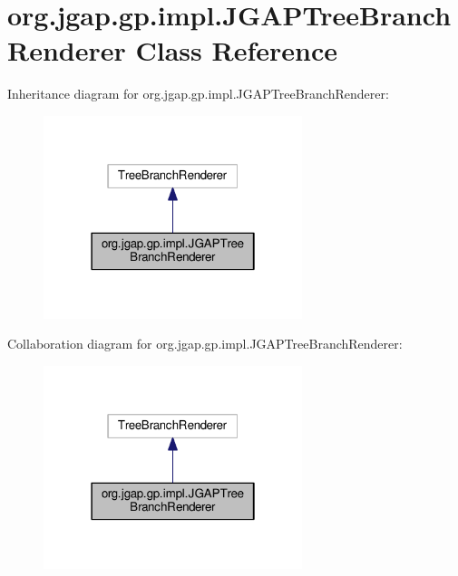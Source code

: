 \hypertarget{classorg_1_1jgap_1_1gp_1_1impl_1_1_j_g_a_p_tree_branch_renderer}{\section{org.\-jgap.\-gp.\-impl.\-J\-G\-A\-P\-Tree\-Branch\-Renderer Class Reference}
\label{classorg_1_1jgap_1_1gp_1_1impl_1_1_j_g_a_p_tree_branch_renderer}
}


Inheritance diagram for org.\-jgap.\-gp.\-impl.\-J\-G\-A\-P\-Tree\-Branch\-Renderer\-:
\nopagebreak
\begin{figure}[H]
\begin{center}
\leavevmode
\includegraphics[width=214pt]{classorg_1_1jgap_1_1gp_1_1impl_1_1_j_g_a_p_tree_branch_renderer__inherit__graph}
\end{center}
\end{figure}


Collaboration diagram for org.\-jgap.\-gp.\-impl.\-J\-G\-A\-P\-Tree\-Branch\-Renderer\-:
\nopagebreak
\begin{figure}[H]
\begin{center}
\leavevmode
\includegraphics[width=214pt]{classorg_1_1jgap_1_1gp_1_1impl_1_1_j_g_a_p_tree_branch_renderer__coll__graph}
\end{center}
\end{figure}
